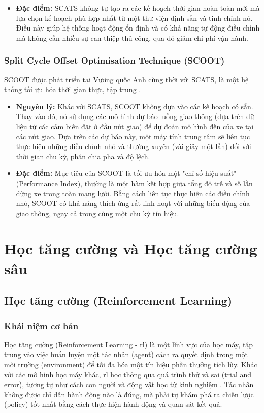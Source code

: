 \begin{enumerate}
\begin{itemize}
    \item \textbf{Đặc điểm:} SCATS không tự tạo ra các kế hoạch thời gian hoàn
        toàn mới mà lựa chọn kế hoạch phù hợp nhất từ một thư viện định sẵn và
        tinh chỉnh nó. Điều này giúp hệ thống hoạt động ổn định và có khả năng tự
        động điều chỉnh mà không cần nhiều sự can thiệp thủ công, qua đó giảm
        chi phí vận hành.
\end{itemize}

\subsubsection{Split Cycle Offset Optimisation Technique (SCOOT)}
SCOOT được phát triển tại Vương quốc Anh cùng thời với SCATS, là một hệ thống
tối ưu hóa thời gian thực, tập trung \cite{Hunt1981}.
\begin{itemize}
    \item \textbf{Nguyên lý:} Khác với SCATS, SCOOT không dựa vào các kế hoạch có
        sẵn. Thay vào đó, nó sử dụng các mô hình dự báo luồng giao thông (dựa
        trên dữ liệu từ các cảm biến đặt ở đầu nút giao) để dự đoán mô hình đến của
        xe tại các nút giao. Dựa trên các dự báo này, một máy tính trung tâm sẽ liên
        tục thực hiện những điều chỉnh nhỏ và thường xuyên (vài giây một lần) đối
        với thời gian chu kỳ, phân chia pha và độ lệch.

    \item \textbf{Đặc điểm:} Mục tiêu của SCOOT là tối ưu hóa một "chỉ số hiệu suất"
        (Performance Index), thường là một hàm kết hợp giữa tổng độ trễ và số lần
        dừng xe trong toàn mạng lưới. Bằng cách liên tục thực hiện các điều
        chỉnh nhỏ, SCOOT có khả năng thích ứng rất linh hoạt với những biến động
        của giao thông, ngay cả trong cùng một chu kỳ tín hiệu.
\end{itemize}

\section{Học tăng cường và Học tăng cường sâu}
\subsection{Học tăng cường (Reinforcement Learning)}
\subsubsection{Khái niệm cơ bản}
Học tăng cường (Reinforcement Learning - \ac{rl}) là một lĩnh vực của học máy, tập
trung vào việc huấn luyện một tác nhân (agent) cách ra quyết định trong một môi trường
(environment) để tối đa hóa một tín hiệu phần thưởng tích lũy. Khác với các mô
hình học máy khác, \ac{rl} học thông qua quá trình thử và sai (trial and error),
tương tự như cách con người và động vật học từ kinh nghiệm \cite{Sutton2018}.
Tác nhân không được chỉ dẫn hành động nào là đúng, mà phải tự khám phá ra chiến lược
(policy) tốt nhất bằng cách thực hiện hành động và quan sát kết quả.


\end{enumerate}
